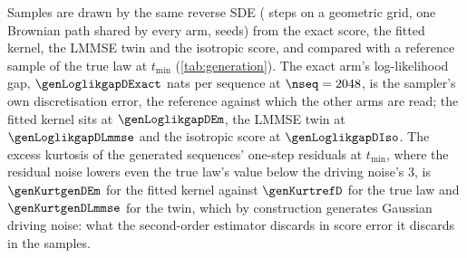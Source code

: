 Samples are drawn by the same reverse SDE (\genSteps{} steps on a geometric grid, one
Brownian path shared by every arm, \genSeeds{} seeds) from the exact score, the fitted
kernel, the LMMSE twin and the isotropic score, and compared with a reference sample of
the true law at $t_{\min}$ (\cref{tab:generation}). The exact arm's log-likelihood gap,
$\genLoglikgapDExact$ nats per sequence at $\nseq=2048$, is the sampler's own discretisation
error, the reference against which the other arms are read; the fitted kernel sits at $\genLoglikgapDEm$, the LMMSE twin at
$\genLoglikgapDLmmse$ and the isotropic score at $\genLoglikgapDIso$. The excess kurtosis of the
generated sequences' one-step residuals at $t_{\min}$, where the residual noise
lowers even the true law's value below the driving noise's $3$, is $\genKurtgenDEm$ for the
fitted kernel against $\genKurtrefD$ for the true law and $\genKurtgenDLmmse$ for the twin, which by
construction generates Gaussian driving noise: what the second-order estimator discards in
score error it discards in the samples.
